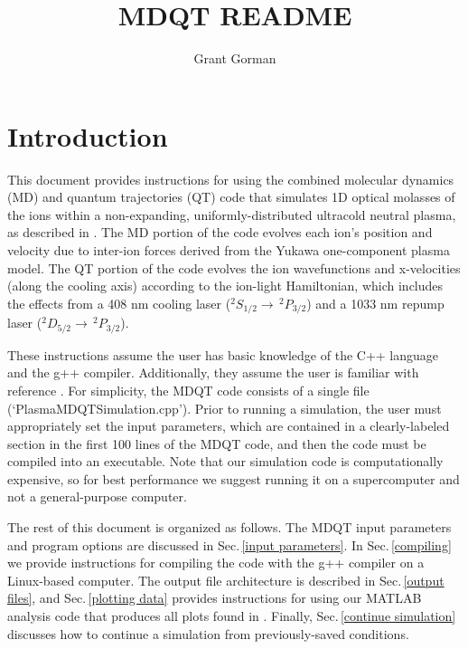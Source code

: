 \documentclass{article}
\author{Grant Gorman}
\title{MDQT README}
\begin{document}
	
	\maketitle
	
	\section{Introduction} \label{intro}
	
	This document provides instructions for using the combined molecular dynamics (MD) and quantum trajectories (QT) code that simulates 1D optical molasses of the ions within a non-expanding, uniformly-distributed ultracold neutral plasma, as described in \cite{glk2019}.
	The MD portion of the code evolves each ion's position and velocity due to inter-ion forces derived from the Yukawa one-component plasma model. 
	The QT portion of the code evolves the ion wavefunctions and x-velocities (along the cooling axis) according to the ion-light Hamiltonian, which includes the effects from a 408 nm cooling laser ($^2S_{1/2}\rightarrow\,^2P_{3/2}$) and a 1033 nm repump laser ($^2D_{5/2}\rightarrow\,^2P_{3/2}$).
	
	These instructions assume the user has basic knowledge of the C++ language and the g++ compiler. Additionally, they assume the user is familiar with reference \cite{glk2019}. For simplicity, the MDQT code consists of a single file (`PlasmaMDQTSimulation.cpp'). Prior to running a simulation, the user must appropriately set the input parameters, which are contained in a clearly-labeled section in the first 100 lines of the MDQT code, and then the code must be compiled into an executable. Note that our simulation code is computationally expensive, so for best performance we suggest running it on a supercomputer and not a general-purpose computer. 
	
	The rest of this document is organized as follows. The MDQT input parameters and program options are discussed in Sec.\,\ref{input parameters}. In Sec.\,\ref{compiling} we provide instructions for compiling the code with the g++ compiler on a Linux-based computer. The output file architecture is described in Sec.\,\ref{output files}, and Sec.\,\ref{plotting data} provides instructions for using our MATLAB analysis code that produces all plots found in \cite{glk2019}. Finally, Sec.\,\ref{continue simulation} discusses how to continue a simulation from previously-saved conditions.
	
\end{document}
